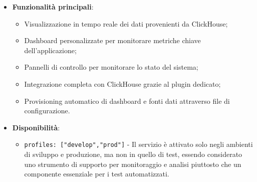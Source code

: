 \documentclass[10pt]{article}
\begin{document}
\begin{itemize}
        \item \textbf{Funzionalità principali}:
        \begin{itemize}
            \item Visualizzazione in tempo reale dei dati provenienti da ClickHouse;
            \item Dashboard personalizzate per monitorare metriche chiave dell'applicazione;
            \item Pannelli di controllo per monitorare lo stato del sistema;
            \item Integrazione completa con ClickHouse grazie al plugin dedicato;
            \item Provisioning automatico di dashboard e fonti dati attraverso file di configurazione.
        \end{itemize}
        
        \item \textbf{Disponibilità}:
        \begin{itemize}
            \item \texttt{profiles: ["develop","prod"]} - Il servizio è attivato solo negli ambienti di sviluppo e produzione, ma non in quello di test, essendo considerato uno strumento di supporto per monitoraggio e analisi piuttosto che un componente essenziale per i test automatizzati.
        \end{itemize}
        \end{itemize}
                
\end{document}
